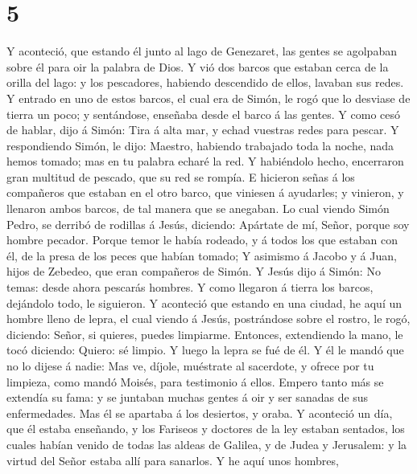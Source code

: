 \hypertarget{section-4}{%
\section{5}\label{section-4}}

 Y aconteció, que estando él junto al lago de Genezaret, las
gentes se agolpaban sobre él para oir la palabra de Dios.  Y
vió dos barcos que estaban cerca de la orilla del lago: y los
pescadores, habiendo descendido de ellos, lavaban sus redes.
 Y entrado en uno de estos barcos, el cual era de Simón, le
rogó que lo desviase de tierra un poco; y sentándose, enseñaba desde el
barco á las gentes.  Y como cesó de hablar, dijo á Simón:
Tira á alta mar, y echad vuestras redes para pescar.  Y
respondiendo Simón, le dijo: Maestro, habiendo trabajado toda la noche,
nada hemos tomado; mas en tu palabra echaré la red.  Y
habiéndolo hecho, encerraron gran multitud de pescado, que su red se
rompía.  E hicieron señas á los compañeros que estaban en el
otro barco, que viniesen á ayudarles; y vinieron, y llenaron ambos
barcos, de tal manera que se anegaban.  Lo cual viendo Simón
Pedro, se derribó de rodillas á Jesús, diciendo: Apártate de mí, Señor,
porque soy hombre pecador.  Porque temor le había rodeado, y
á todos los que estaban con él, de la presa de los peces que habían
tomado;  Y asimismo á Jacobo y á Juan, hijos de Zebedeo,
que eran compañeros de Simón. Y Jesús dijo á Simón: No temas: desde
ahora pescarás hombres.  Y como llegaron á tierra los
barcos, dejándolo todo, le siguieron.  Y aconteció que
estando en una ciudad, he aquí un hombre lleno de lepra, el cual viendo
á Jesús, postrándose sobre el rostro, le rogó, diciendo: Señor, si
quieres, puedes limpiarme.  Entonces, extendiendo la mano,
le tocó diciendo: Quiero: sé limpio. Y luego la lepra se fué de él.
 Y él le mandó que no lo dijese á nadie: Mas ve, díjole,
muéstrate al sacerdote, y ofrece por tu limpieza, como mandó Moisés,
para testimonio á ellos.  Empero tanto más se extendía su
fama: y se juntaban muchas gentes á oir y ser sanadas de sus
enfermedades.  Mas él se apartaba á los desiertos, y oraba.
 Y aconteció un día, que él estaba enseñando, y los
Fariseos y doctores de la ley estaban sentados, los cuales habían venido
de todas las aldeas de Galilea, y de Judea y Jerusalem: y la virtud del
Señor estaba allí para sanarlos.  Y he aquí unos hombres,
